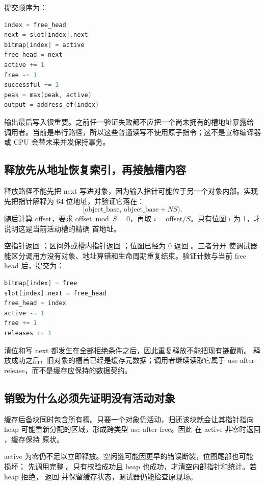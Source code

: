 提交顺序为：

\begin{lstlisting}[language=C++]
index = free_head
next = slot[index].next
bitmap[index] = active
free_head = next
active += 1
free -= 1
successful += 1
peak = max(peak, active)
output = address_of(index)
\end{lstlisting}

输出最后写入很重要。之前任一验证失败都不应把一个尚未拥有的槽地址暴露给
调用者。当前是串行路径，所以这些普通读写不使用原子指令；这不是宣称编译器
或 CPU 会替未来并发保持事务。

\subsection{释放先从地址恢复索引，再接触槽内容}

释放路径不能先把 next 写进对象，因为输入指针可能位于另一个对象内部。实现
先把指针解释为 64 位地址，并验证它落在：
\[
  [\mathrm{object\_base},\,
    \mathrm{object\_base}+N S).
\]
随后计算 offset，要求 \(\mathrm{offset}\bmod S=0\)，再取
\(i=\mathrm{offset}/S\)。只有位图 \(i\) 为 1，才说明这是当前活动槽的精确
首地址。

空指针返回 ；区间外或槽内指针返回
；位图已经为 0 返回 。三者分开
使调试器能区分调用方没有对象、地址算错和生命周期重复结束。验证计数与当前
free head 后，提交为：

\begin{lstlisting}[language=C++]
bitmap[index] = free
slot[index].next = free_head
free_head = index
active -= 1
free += 1
releases += 1
\end{lstlisting}

清位和写 next 都发生在全部拒绝条件之后，因此重复释放不能把现有链截断。
释放成功之后，旧对象的槽首已经是缓存元数据；调用者继续读取它属于 use-after-
release，而不是缓存应保持的数据契约。

\subsection{销毁为什么必须先证明没有活动对象}

缓存后备块同时包含所有槽。只要一个对象仍活动，归还该块就会让其指针指向
heap 可能重新分配的区域，形成跨类型 use-after-free。因此
 在 active 非零时返回 ，缓存保持
原状。

active 为零仍不足以立即释放。空闲链可能因更早的错误断裂，位图尾部也可能
损坏； 先调用完整 。只有校验成功且 heap
 也成功，才清空内部指针和统计。若 heap 拒绝，
返回  并保留缓存状态，调试器仍能检查原现场。

